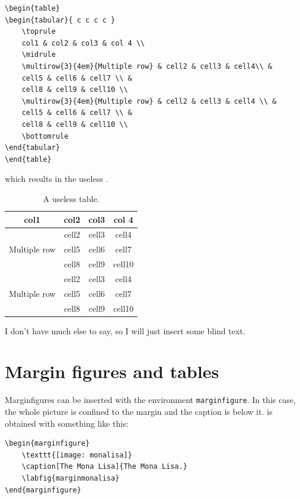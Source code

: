 \begin{lstlisting}
\begin{table}
\begin{tabular}{ c c c c }
	\toprule
	col1 & col2 & col3 & col 4 \\
	\midrule
	\multirow{3}{4em}{Multiple row} & cell2 & cell3 & cell4\\ &
	cell5 & cell6 & cell7 \\ &
	cell8 & cell9 & cell10 \\
	\multirow{3}{4em}{Multiple row} & cell2 & cell3 & cell4 \\ &
	cell5 & cell6 & cell7 \\ &
	cell8 & cell9 & cell10 \\
	\bottomrule
\end{tabular}
\end{table}
\end{lstlisting}

which results in the useless .

\begin{table}[b]
\caption[A useless table]{A useless table.}
\begin{tabular}{ c c c c }
	\toprule
	col1 & col2 & col3 & col 4 \\
	\midrule
	\multirow{3}{4em}{Multiple row} & cell2 & cell3 & cell4\\ &
	cell5 & cell6 & cell7 \\ &
	cell8 & cell9 & cell10 \\
	\multirow{3}{4em}{Multiple row} & cell2 & cell3 & cell4 \\ &
	cell5 & cell6 & cell7 \\ &
	cell8 & cell9 & cell10 \\
	\bottomrule
\end{tabular}
\end{table}

I don't have much else to say, so I will just insert some blind text. 
\blindtext

\section{Margin figures and tables}

Marginfigures can be inserted with the environment \verb|marginfigure|. 
In this case, the whole picture is confined to the margin and the 
caption is below it.  is obtained with something 
like this:

\begin{lstlisting}
\begin{marginfigure}
	\texttt{[image: monalisa]}
	\caption[The Mona Lisa]{The Mona Lisa.}
	\labfig{marginmonalisa}
\end{marginfigure}
\end{lstlisting}

